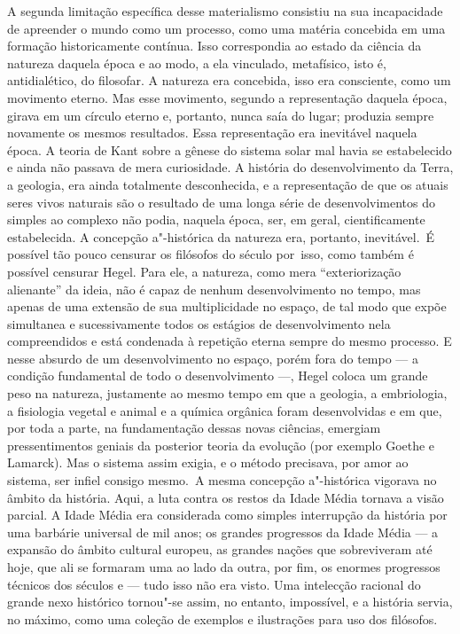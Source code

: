A segunda limitação específica desse materialismo consistiu na sua
incapacidade de apreender o mundo como um processo, como uma matéria
concebida em uma formação historicamente contínua. Isso correspondia ao
estado da ciência da natureza daquela época e ao modo, a ela vinculado,
metafísico, isto é, antidialético, do filosofar. A natureza era %
concebida, isso era consciente, como um movimento eterno. Mas esse
movimento, segundo a representação daquela época, girava em um círculo
eterno e, portanto, nunca saía do lugar; produzia sempre novamente os %
mesmos resultados. Essa representação era inevitável naquela época. A
teoria
de Kant sobre
a gênese do sistema solar mal havia se estabelecido e ainda não passava
de mera curiosidade. A história do desenvolvimento da Terra, a geologia,
era ainda totalmente desconhecida, e a representação de que os atuais seres
vivos naturais são o resultado de uma longa série de
desenvolvimentos do simples ao complexo não podia, naquela época, ser,
em geral, cientificamente estabelecida. A concepção a"-histórica
da natureza era, portanto, inevitável. 
 \textbar{}\,É possível tão pouco censurar os filósofos do século  por\est\ isso, %
como também é possível censurar Hegel. Para ele, a natureza, como mera %
``exteriorização alienante'' da ideia, não é capaz 
de nenhum desenvolvimento no tempo, mas apenas de uma extensão de sua
multiplicidade no espaço, de tal modo que expõe simultanea e
sucessivamente todos os estágios de desenvolvimento nela compreendidos e
está condenada à repetição eterna sempre do mesmo processo. E nesse %
absurdo de um desenvolvimento no espaço, porém fora do tempo --- a
condição fundamental de todo o desenvolvimento ---,
Hegel coloca
um grande peso na natureza, justamente ao mesmo tempo em que a geologia,
a embriologia, a fisiologia vegetal e animal e a química orgânica foram
desenvolvidas e em que, por toda a parte, na fundamentação dessas novas
ciências, emergiam pressentimentos geniais da posterior teoria da
evolução (por exemplo Goethe e Lamarck).
Mas o sistema assim exigia, e o método precisava, por amor ao sistema,
ser infiel consigo mesmo.\,\textbar{} A mesma concepção a"-histórica
vigorava no âmbito da história. Aqui, a luta contra os restos da Idade
Média tornava a visão parcial. A Idade Média era considerada como
simples interrupção da história por uma barbárie 
universal de mil anos; os grandes progressos da Idade Média --- a expansão
do âmbito cultural europeu, as grandes nações que sobreviveram até hoje,
que ali se formaram uma ao lado da outra, por fim, os enormes progressos
técnicos dos séculos  e  --- tudo isso não era visto. Uma %
intelecção
racional do grande nexo histórico tornou"-se assim, no entanto, %
impossível, e a história servia, no máximo, como uma coleção de exemplos
e ilustrações para uso dos filósofos.

